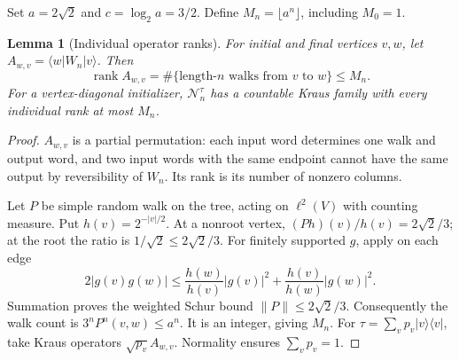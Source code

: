 \documentclass[11pt]{article}
\newtheorem{lemma}[theorem]{Lemma}
\newcommand{\rank}{\operatorname{rank}}
\newcommand{\ket}[1]{\lvert #1\rangle}
\newcommand{\bra}[1]{\langle #1\rvert}
\newcommand{\norm}[1]{\lVert #1\rVert}
\newcommand{\cN}{\mathcal N}
\begin{document}
Set $a=2\sqrt2$ and $c=\log_2a=3/2$. Define $M_n=\lfloor a^n\rfloor$, including $M_0=1$.

\begin{lemma}[Individual operator ranks]\label{lem:walk}
For initial and final vertices $v,w$, let $A_{w,v}=\bra wW_n\ket v$. Then
\[
 \rank A_{w,v}=\#\{\text{length-$n$ walks from $v$ to $w$}\}\le M_n.
\]
For a vertex-diagonal initializer, $\cN_n^\tau$ has a countable Kraus family with every individual rank at most $M_n$.
\end{lemma}
\begin{proof}
$A_{w,v}$ is a partial permutation: each input word determines one walk and output word, and two input words with the same endpoint cannot have the same output by reversibility of $W_n$. Its rank is its number of nonzero columns.

Let $P$ be simple random walk on the tree, acting on $\ell^2(V)$ with counting measure. Put $h(v)=2^{-|v|/2}$. At a nonroot vertex, $(Ph)(v)/h(v)=2\sqrt2/3$; at the root the ratio is $1/\sqrt2\le2\sqrt2/3$. For finitely supported $g$, apply on each edge
\[
 2|g(v)g(w)|\le\frac{h(w)}{h(v)}|g(v)|^2+
 \frac{h(v)}{h(w)}|g(w)|^2.
\]
Summation proves the weighted Schur bound $\norm P\le2\sqrt2/3$. Consequently the walk count is $3^nP^n(v,w)\le a^n$. It is an integer, giving $M_n$. For $\tau=\sum_v p_v\ket v\bra v$, take Kraus operators $\sqrt{p_v}A_{w,v}$. Normality ensures $\sum_v p_v=1$.
\end{proof}
\end{document}
